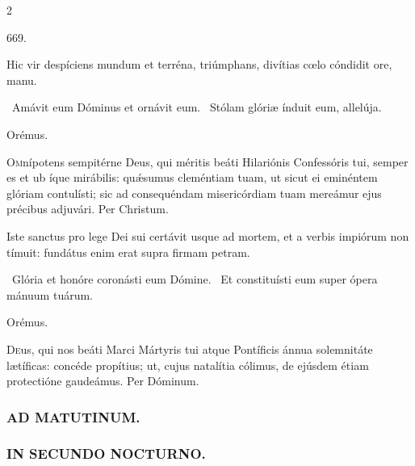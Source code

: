 \documentclass[9pt,twoside]{extarticle}
\begin{document}
\begin{multicols}{2}
\begin{tightlist}{}
\item {} 669. 
\item {} Hic vir despíciens mundum et terréna, triúmphans, divítias cœlo cóndidit ore, manu.
\item {}~Amávit eum Dóminus et ornávit eum. ~Stólam glóriæ índuit eum, allelúja.
\item Orémus. \hfill {}
\end{tightlist}
\lettrine{O}mnípotens sempitérne Deus, qui méritis beáti Hilariónis Confessóris tui, semper es et ub íque mirábilis: quǽsumus cleméntiam tuam, ut sicut ei eminéntem glóriam contulísti; sic ad consequéndam misericórdiam tuam mereámur ejus précibus adjuvári. Per Christum.

\begin{tightlist}{}
\item {} Iste sanctus pro lege Dei sui certávit usque ad mortem, et a verbis impiórum non tímuit: fundátus enim erat supra firmam petram.
\item {}~Glória et honóre coronásti eum Dómine. ~Et constituísti eum super ópera mánuum tuárum.
\item Orémus. \hfill {}
\end{tightlist}
\lettrine{D}eus, qui nos beáti Marci Mártyris tui atque Pontíficis ánnua solemnitáte lætíficas: concéde propítius; ut, cujus natalítia cólimus, de ejúsdem étiam protectióne gaudeámus. Per Dóminum.

\subsubsection*{\center \textsc{AD MATUTINUM.}}
\begin{tightlist}{}
\item {}
\end{tightlist}

\subsubsection*{\center \textsc{IN SECUNDO NOCTURNO.}}

\end{multicols}
\end{document}
